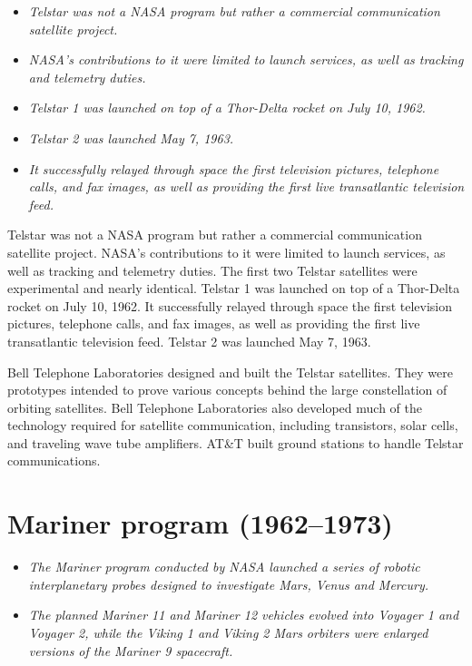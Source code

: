 \begin{itemize}
\item
  \emph{Telstar was not a NASA program but rather a commercial
  communication satellite project.}
\item
  \emph{NASA's contributions to it were limited to launch services, as
  well as tracking and telemetry duties.}
\item
  \emph{Telstar 1 was launched on top of a Thor-Delta rocket on July 10,
  1962.}
\item
  \emph{Telstar 2 was launched May 7, 1963.}
\item
  \emph{It successfully relayed through space the first television
  pictures, telephone calls, and fax images, as well as providing the
  first live transatlantic television feed.}
\end{itemize}

Telstar was not a NASA program but rather a commercial communication
satellite project. NASA's contributions to it were limited to launch
services, as well as tracking and telemetry duties. The first two
Telstar satellites were experimental and nearly identical. Telstar 1 was
launched on top of a Thor-Delta rocket on July 10, 1962. It successfully
relayed through space the first television pictures, telephone calls,
and fax images, as well as providing the first live transatlantic
television feed. Telstar 2 was launched May 7, 1963.

Bell Telephone Laboratories designed and built the Telstar satellites.
They were prototypes intended to prove various concepts behind the large
constellation of orbiting satellites. Bell Telephone Laboratories also
developed much of the technology required for satellite communication,
including transistors, solar cells, and traveling wave tube amplifiers.
AT\&T built ground stations to handle Telstar communications.

\section{Mariner program (1962--1973)}\label{mariner-program-19621973}

\begin{itemize}
\item
  \emph{The Mariner program conducted by NASA launched a series of
  robotic interplanetary probes designed to investigate Mars, Venus and
  Mercury.}
\item
  \emph{The planned Mariner 11 and Mariner 12 vehicles evolved into
  Voyager 1 and Voyager 2, while the Viking 1 and Viking 2 Mars orbiters
  were enlarged versions of the Mariner 9 spacecraft.}
\end{itemize}

